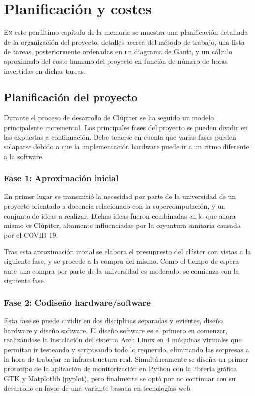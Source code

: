 \chapter{Planificación y costes}
\label{chap:planificacion_costes}

\lettrine{E}{n} este penúltimo capítulo de la memoria se muestra una planificación detallada de la organización del proyecto, detalles acerca del método de trabajo, una lista de tareas, posteriormente ordenadas en un diagrama de Gantt, y un cálculo aproximado del coste humano del proyecto en función de número de horas invertidas en dichas tareas. 

\section{Planificación del proyecto}
Durante el proceso de desarrollo de Clúpiter se ha seguido un modelo principalente incremental. Las principales fases del proyecto se pueden dividir en las expuestas a continuación. Debe tenerse en cuenta que varias fases pueden solaparse debido a que la implementación hardware puede ir a un ritmo diferente a la software.

\subsection{Fase 1: Aproximación inicial}
En primer lugar se transmitió la necesidad por parte de la universidad de un proyecto orientado a docencia relacionado con la supercomputación, y un conjunto de ideas a realizar. Dichas ideas fueron combinadas en lo que ahora mismo es Clúpiter, altamente influenciadas por la coyuntura sanitaria causada por el COVID-19.

Tras esta aproximación inicial se elabora el presupuesto del clúster con vistas a la siguiente fase, y se procede a la compra del mismo. Como el tiempo de espera ante una compra por parte de la universidad es moderado, se comienza con la siguiente fase.

\subsection{Fase 2: Codiseño hardware/software}
Esta fase se puede dividir en dos disciplinas separadas y evientes, diseño hardware y diseño software. El diseño software es el primero en comenzar, realizándose la instalación del sistema Arch Linux en 4 máquinas virtuales que permitan ir testeando y scripteando todo lo requerido, eliminando las sorpresas a la hora de trabajar en infraestructura real. Simultáneamente se diseña un primer prototipo de la aplicación de monitorización en Python con la librería gráfica GTK y Matplotlib (pyplot), pero finalmente se optó por no continuar con su desarrollo en favor de una variante basada en tecnologías web.

